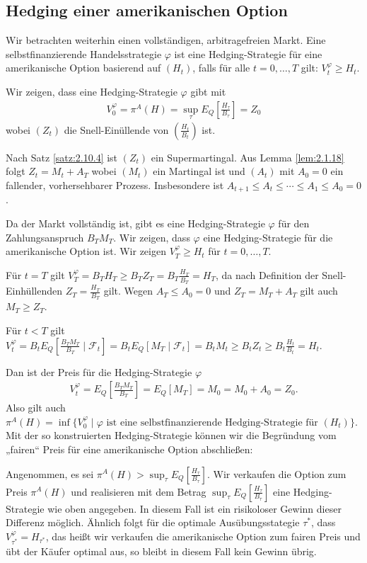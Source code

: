 \documentclass[a4paper,twoside,DIV15,BCOR12mm]{scrbook}
\newcommand{\cF}{\mathcal F}
\begin{document}
\subsection{Hedging einer amerikanischen Option}

Wir betrachten weiterhin einen vollständigen, arbitragefreien Markt. Eine selbstfinanzierende Handelsstrategie $\varphi$ ist eine Hedging-Strategie für eine amerikanische Option basierend auf $(H_t)$, falls für alle $t=0,\ldots,T$ gilt: $V_t^\varphi \ge H_t$.

Wir zeigen, dass eine Hedging-Strategie $\varphi$ gibt mit
\begin{align*}
V_0^\varphi = \pi^A(H) = \sup_{\tau} E_Q[\frac{H_\tau}{B_\tau}] = Z_0
\end{align*}
wobei $(Z_t)$ die Snell-Einüllende von $(\frac{H_t}{B_t})$ ist.

Nach Satz \ref{satz:2.10.4} ist $(Z_t)$ ein Supermartingal. Aus Lemma \ref{lem:2.1.18} folgt $Z_t = M_t + A_T$ wobei $(M_t)$ ein Martingal ist und $(A_t)$ mit $A_0=0$ ein fallender, vorhersehbarer Prozess. Insbesondere ist $A_{t+1} \le A_t \le \cdots \le A_1 \le A_0 = 0$.

Da der Markt vollständig ist, gibt es eine Hedging-Strategie $\varphi$ für den Zahlungsanspruch $B_TM_T$. Wir zeigen, dass $\varphi$ eine Hedging-Strategie für die amerikanische Option ist. Wir zeigen $V_T^\varphi \ge H_t$ für $t=0,\ldots,T$.

Für $t=T$ gilt $V_T^\varphi = B_TH_T \ge B_TZ_T = B_T \frac{H_T}{B_T} = H_T$, da nach Definition der Snell-Einhüllenden $Z_T = \frac{H_T}{B_T}$ gilt. Wegen $A_T \le A_0=0$ und $Z_T = M_T + A_T$ gilt auch $M_T \ge Z_T$.

Für $t<T$ gilt $V_t^\varphi = B_t E_Q[\frac{B_TM_T}{B_T}\mid \cF_t] = B_tE_Q[M_T\mid \cF_t] = B_t M_t \ge B_tZ_t \ge B_t \frac{H_t}{B_t} = H_t$.

Dan ist der Preis für die Hedging-Strategie $\varphi$
\begin{align*}
V_t^\varphi = E_Q[\frac{B_TM_T}{B_T}] = E_Q[M_T] = M_0 = M_0 + A_0 = Z_0.
\end{align*}
Also gilt auch $\pi^A(H) = \inf\{V_0^\varphi \mid \varphi\text{ ist eine selbstfinanzierende Hedging-Strategie für $(H_t)$}\}$. Mit der so konstruierten Hedging-Strategie können wir die Begründung vom „fairen“ Preis für eine amerikanische Option abschließen:

Angenommen, es sei $\pi^{A}(H) > \sup_\tau E_Q[\frac{H_\tau}{B_\tau}]$. Wir verkaufen die Option zum Preis $\pi^A(H)$ und realisieren mit dem Betrag $\sup_{\tau}E_Q[\frac{H_\tau}{B_\tau}]$ eine Hedging-Strategie wie oben angegeben. In diesem Fall ist ein risikoloser Gewinn dieser Differenz möglich. Ähnlich folgt für die optimale Ausübungsstategie $\tau^*$, dass $V_{\tau^*}^\varphi = H_{\tau^*}$, das heißt wir verkaufen die amerikanische Option zum fairen Preis und übt der Käufer optimal aus, so bleibt in diesem Fall kein Gewinn übrig.
\end{document}
